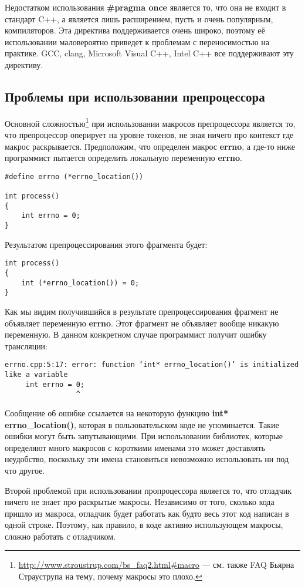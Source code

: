 Недостатком использования {\bf \#pragma once} является то, что она не входит в стандарт C++, а является лишь расширением, пусть и очень популярным, компиляторов. Эта директива поддерживается очень широко, поэтому её использовании маловероятно приведет к проблемам с переносимостью на практике. GCC, clang, Microsoft Visual C++, Intel C++ все поддерживают эту директиву.

\subsection{Проблемы при использовании препроцессора}
Основной сложностью\footnote{\url{http://www.stroustrup.com/bs_faq2.html\#macro} --- см. также FAQ Бьярна Страуструпа на тему, почему макросы это плохо.} при использовании макросов препроцессора является то, что препроцессор оперирует на уровне токенов, не зная ничего про контекст где макрос раскрывается. Предположим, что определен макрос {\bf errno}, а где-то ниже программист пытается определить локальную переменную {\bf errno}.
\begin{verbatim}
#define errno (*errno_location())

int process()
{
    int errno = 0;
}
\end{verbatim}
Результатом препроцессирования этого фрагмента будет:
\begin{verbatim}
int process()
{
    int (*errno_location()) = 0;
}
\end{verbatim}
Как мы видим получившийся в результате препроцессирования фрагмент не объявляет переменную {\bf errno}. Этот фрагмент не объявляет вообще никакую переменную. В данном конкретном случае программист получит ошибку трансляции:
\begin{verbatim}
errno.cpp:5:17: error: function ‘int* errno_location()’ is initialized like a variable
     int errno = 0;
                 ^
\end{verbatim}
Сообщение об ошибке ссылается на некоторую функцию {\bf int* errno\_location()}, которая в пользовательском коде не упоминается. Такие ошибки могут быть запутывающими. При использовании библиотек, которые определяют много макросов с короткими именами это может доставлять неудобство, поскольку эти имена становиться невозможно использовать ни под что другое.

Второй проблемой при использовании пропроцессора является то, что отладчик ничего не знает про раскрытые макросы. Независимо от того, сколько кода пришло из макроса, отладчик будет работать как будто весь этот код написан в одной строке. Поэтому, как правило, в коде активно использующем макросы, сложно работать с отладчиком.

